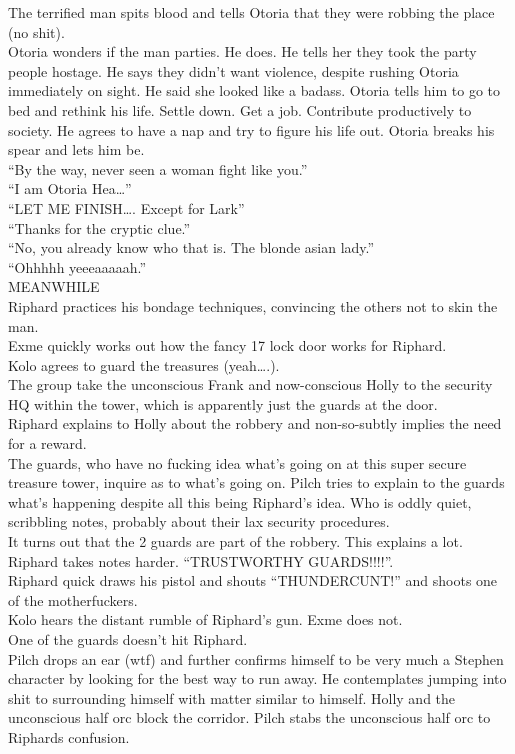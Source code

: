 The terrified man spits blood and tells Otoria that they were robbing the place (no shit).\\
Otoria wonders if the man parties. He does. He tells her they took the party people hostage. He says they didn’t want violence, despite rushing Otoria immediately on sight. He said she looked like a badass. Otoria tells him to go to bed and rethink his life. Settle down. Get a job. Contribute productively to society. He agrees to have a nap and try to figure his life out. Otoria breaks his spear and lets him be.\\
“By the way, never seen a woman fight like you.”\\
“I am Otoria Hea…”\\
“LET ME FINISH…. Except for Lark”\\
“Thanks for the cryptic clue.”\\
“No, you already know who that is. The blonde asian lady.”\\
“Ohhhhh yeeeaaaaah.”\\
MEANWHILE\\
Riphard practices his bondage techniques, convincing the others not to skin the man.\\
Exme quickly works out how the fancy 17 lock door works for Riphard.\\
Kolo agrees to guard the treasures (yeah….).\\
The group take the unconscious Frank and now-conscious Holly to the security HQ within the tower, which is apparently just the guards at the door.\\
Riphard explains to Holly about the robbery and non-so-subtly implies the need for a reward.\\
The guards, who have no fucking idea what’s going on at this super secure treasure tower, inquire as to what’s going on. Pilch tries to explain to the guards what’s happening despite all this being Riphard’s idea. Who is oddly quiet, scribbling notes, probably about their lax security procedures.\\
It turns out that the 2 guards are part of the robbery. This explains a lot. Riphard takes notes harder. “TRUSTWORTHY GUARDS!!!!”.\\
Riphard quick draws his pistol and shouts “THUNDERCUNT!” and shoots one of the motherfuckers.\\
Kolo hears the distant rumble of Riphard’s gun. Exme does not.\\
One of the guards doesn’t hit Riphard.\\
Pilch drops an ear (wtf) and further confirms himself to be very much a Stephen character by looking for the best way to run away. He contemplates jumping into shit to surrounding himself with matter similar to himself. Holly and the unconscious half orc block the corridor. Pilch stabs the unconscious half orc to Riphards confusion.\\
